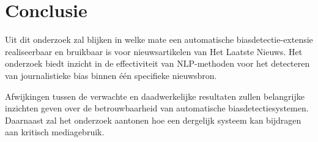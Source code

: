 \section{Conclusie}
\label{sec:conclusie}

Uit dit onderzoek zal blijken in welke mate een automatische biasdetectie-extensie realiseerbaar en bruikbaar is voor nieuwsartikelen van Het Laatste Nieuws. Het onderzoek biedt inzicht in de effectiviteit van NLP-methoden voor het detecteren van journalistieke bias binnen één specifieke nieuwsbron.

Afwijkingen tussen de verwachte en daadwerkelijke resultaten zullen belangrijke inzichten geven over de betrouwbaarheid van automatische biasdetectiesystemen. Daarnaast zal het onderzoek aantonen hoe een dergelijk systeem kan bijdragen aan kritisch mediagebruik.